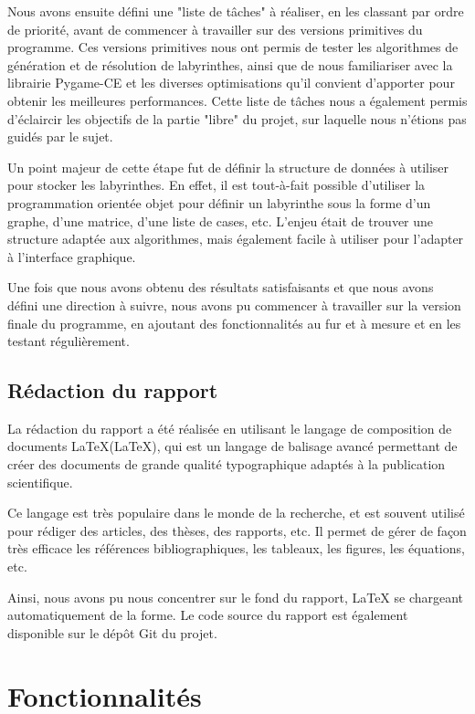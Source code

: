 \documentclass[12pt]{scrreprt} %
\begin{document}
Nous avons ensuite défini une "liste de tâches" à réaliser, en les classant par ordre de priorité, avant de commencer à travailler sur des versions primitives du programme. Ces versions primitives nous ont permis de tester les algorithmes de génération et de résolution de labyrinthes, ainsi que de nous familiariser avec la librairie Pygame-CE et les diverses optimisations qu'il convient d'apporter pour obtenir les meilleures performances. Cette liste de tâches nous a également permis d'éclaircir les objectifs de la partie "libre" du projet, sur laquelle nous n'étions pas guidés par le sujet.

Un point majeur de cette étape fut de définir la structure de données à utiliser pour stocker les labyrinthes. En effet, il est tout-à-fait possible d'utiliser la programmation orientée objet pour définir un labyrinthe sous la forme d'un graphe, d'une matrice, d'une liste de cases, etc. L'enjeu était de trouver une structure adaptée aux algorithmes, mais également facile à utiliser pour l'adapter à l'interface graphique.

Une fois que nous avons obtenu des résultats satisfaisants et que nous avons défini une direction à suivre, nous avons pu commencer à travailler sur la version finale du programme, en ajoutant des fonctionnalités au fur et à mesure et en les testant régulièrement.

\section{Rédaction du rapport}

La rédaction du rapport a été réalisée en utilisant le langage de composition de documents \LaTeX (LaTeX), qui est un langage de balisage  avancé permettant de créer des documents de grande qualité typographique adaptés à la publication scientifique.

Ce langage est très populaire dans le monde de la recherche, et est souvent utilisé pour rédiger des articles, des thèses, des rapports, etc. Il permet de gérer de façon très efficace les références bibliographiques, les tableaux, les figures, les équations, etc.

Ainsi, nous avons pu nous concentrer sur le fond du rapport, LaTeX se chargeant automatiquement de la forme. Le code source du rapport est également disponible sur le dépôt Git du projet.

\chapter{Fonctionnalités}
\end{document}
